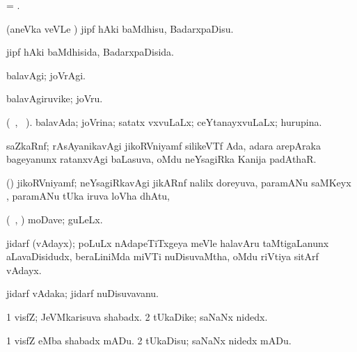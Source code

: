 \bentry
{} 
\gl{\nA} 
\bmng
= .
\emng
\eentry

\bentry
{} 
\gl{\sakirx} 
\bmng
(aneVka veVLe ) jipf hAki baMdhisu, BadarxpaDisu.
\emng
\eentry

\bentry
{} 
\gl{\gu} 
\bmng
jipf hAki baMdhisida, BadarxpaDisida.
\emng
\eentry

\bentry
{} 
\gl{\kirxvi} 
\bmng
balavAgi; joVrAgi.
\emng
\eentry

\bentry
{} 
\gl{\nA} 
\bmng
balavAgiruvike; joVru.
\emng
\eentry

\bentry
{} 
\gl{\gu} 
\bmng
(\tara\ , \tama\ ).
balavAda; joVrina; satatx  vxvuLaLx; ceYtanayxvuLaLx; hurupina.
\emng
\eentry

\bentry
{} 
\gl{\nA} 
\bmng
saZkaRnf; rAsAyanikavAgi jikoRVniyamf silikeVTf Ada, adara arepAraka bageyanunx ratanxvAgi baLasuva, oMdu neYsagiRka Kanija padAthaR.
\emng
\eentry

\bentry
{} 
\gl{\nA}  
\bmng
(\ravi) jikoRVniyamf; neYsagiRkavAgi jikARnf   nalilx doreyuva, paramANu saMKeyx , paramANu tUka  iruva loVha dhAtu, \saMkeV\ 
\emng
\eentry

\bentry
{} 
\gl{\nA}
\bmng
(\kanmu\ \ame, \ashi) moDave; guLeLx.
\emng
\eentry

\bentry
{} 
\gl{\nA}
\bmng
jidarf (vAdayx); poLuLx nAdapeTiTxgeya meVle halavAru taMtigaLanunx aLavaDisidudx, beraLiniMda miVTi nuDisuvaMtha, oMdu riVtiya sitArf vAdayx. \quad {}
\emng
\eentry

\bentry
{} 
\gl{\nA} 
\bmng
jidarf vAdaka; jidarf nuDisuvavanu. 
\emng
\eentry

\bentry
{} 
\gl{\nA} 
\bmng
\bnum
\num{1} visfZ; JeVMkarisuva shabadx. 
\num{2} tUkaDike; saNaNx nidedx.
\enum
\emng 
\eentry

\bentry
{} 
\gl{\akirx} 
\bmng
\bnum
\num{1} visfZ eMba shabadx mADu. 
\num{2} tUkaDisu; saNaNx nidedx mADu.
\enum
\emng
\eentry

